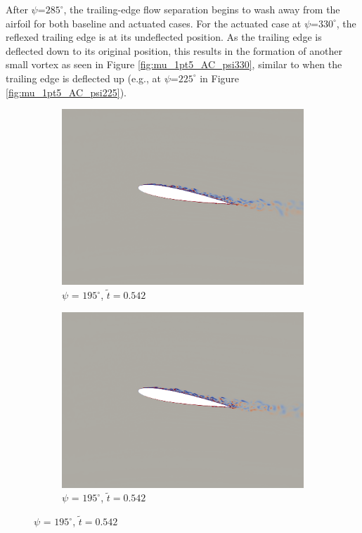 After $\psi$=$285^\circ$, the trailing-edge flow separation begins to wash away from the airfoil for both baseline and actuated cases.
For the actuated case at $\psi$=$330^\circ$, the reflexed trailing edge is at its undeflected position.
As the trailing edge is deflected down to its original position, this results in the formation of another small vortex as seen in Figure \ref{fig:mu_1pt5_AC_psi330}, similar to when the trailing edge is deflected up (e.g., at $\psi$=$225^\circ$ in Figure \ref{fig:mu_1pt5_AC_psi225}).

\begin{figure}[H]
	\centering
	
	\begin{subfigure}[b]{0.4\textwidth}
		\centering
		\includegraphics[width=1\textwidth]{figures/mu_1pt5/vorticity/baseline/phase_195.png}
		\caption{ $\psi$ = $195^\circ$, $\tilde{t}=0.542$}
		\label{fig:mu_1pt5_baseline_psi195}
	\end{subfigure}
	\begin{subfigure}[b]{0.4\textwidth}
		\centering
		\includegraphics[width=1\textwidth]{figures/mu_1pt5/vorticity/AC/phase_195.png}
		\caption{ $\psi$ = $195^\circ$, $\tilde{t}=0.542$}
		\label{fig:mu_1pt5_AC_psi195}
	\end{subfigure}
	

\end{figure}
